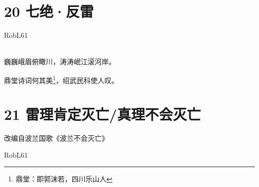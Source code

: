 \documentclass[UTF8,12pt,oneside]{ctexbook}
\begin{document}
        
    \section{20 七绝·反雷}
    \begin{center}
        RobL61
        
        ~\\
        巍巍峨眉俯瞰川，涛涛岷江滚河岸。
        
        鼎堂诗词何其美\footnote{鼎堂：即郭沫若，四川乐山人}，绍武民科使人叹。
        
    \end{center}

    \newpage

    \section{21 雷理肯定灭亡/真理不会灭亡}
    \begin{center}
        \Large \kaishu
        改编自波兰国歌《波兰不会灭亡》
        \songti \large
        
        RobL61
    \end{center}
       
\end{document}
